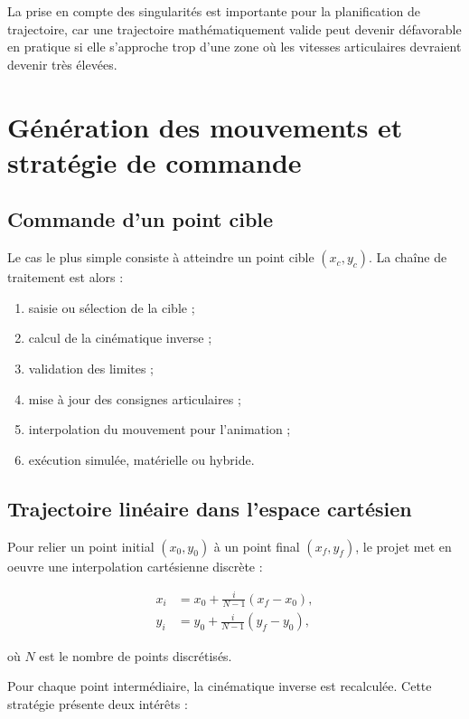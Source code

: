 \documentclass[12pt,a4paper]{report}
\begin{document}
La prise en compte des singularités est importante pour la planification de trajectoire,
car une trajectoire mathématiquement valide peut devenir défavorable en pratique si elle
s'approche trop d'une zone où les vitesses articulaires devraient devenir très élevées.

\chapter{Génération des mouvements et stratégie de commande}\label{chap:commande}

\section{Commande d'un point cible}

Le cas le plus simple consiste à atteindre un point cible $(x_c,y_c)$. La chaîne de
traitement est alors :

\begin{enumerate}[label=\arabic*.]
    \item saisie ou sélection de la cible ;
    \item calcul de la cinématique inverse ;
    \item validation des limites ;
    \item mise à jour des consignes articulaires ;
    \item interpolation du mouvement pour l'animation ;
    \item exécution simulée, matérielle ou hybride.
\end{enumerate}

\section{Trajectoire linéaire dans l'espace cartésien}

Pour relier un point initial $(x_0,y_0)$ à un point final $(x_f,y_f)$, le projet
met en oeuvre une interpolation cartésienne discrète :

\begin{align}
    x_i &= x_0 + \frac{i}{N-1}(x_f-x_0), \\
    y_i &= y_0 + \frac{i}{N-1}(y_f-y_0),
\end{align}

où $N$ est le nombre de points discrétisés.

Pour chaque point intermédiaire, la cinématique inverse est recalculée. Cette stratégie
présente deux intérêts :
\end{document}
